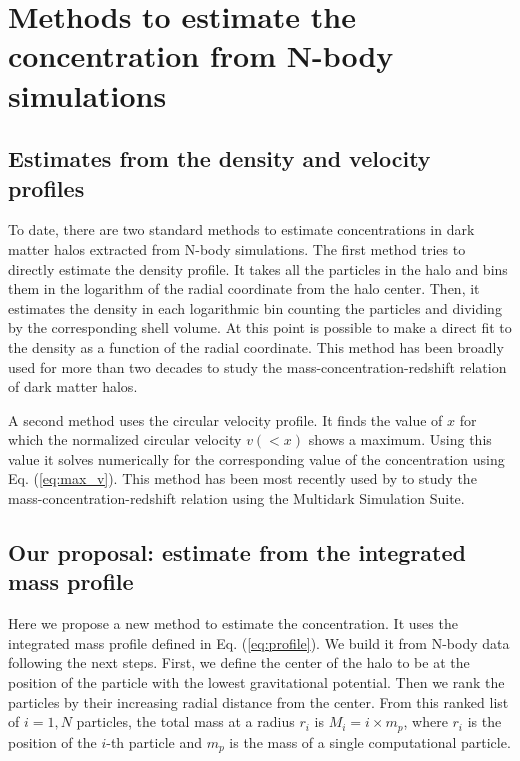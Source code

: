 \documentclass{emulateapj}
\begin{document}
\section{Methods to estimate the concentration from N-body simulations}
\label{sec:method}

\subsection{Estimates from the density and velocity profiles}

To date, there are two standard methods to estimate concentrations in
dark matter halos extracted from N-body simulations.  The first method
tries to directly estimate the density profile.  It takes all the
particles in the halo and bins them in the logarithm of the radial
coordinate from the halo center.  Then, it estimates the density in
each logarithmic bin counting the particles and dividing by the
corresponding shell volume.  At this point is possible to make a
direct fit to the density as a function of the radial coordinate.
This method has been broadly used for more than two decades to study
the mass-concentration-redshift relation of dark matter halos.
 
A second method uses the circular velocity profile.  It finds the
value of $x$ for which the normalized circular velocity $v(<x)$ shows
a maximum.  Using this value it solves numerically for the
corresponding value of the concentration using Eq. (\ref{eq:max_v}).
This method has been most recently used by \cite{Klypin2016} to study
the mass-concentration-redshift relation using the Multidark
Simulation Suite.


\subsection{Our proposal: estimate from the integrated mass profile}

Here we propose a new method to estimate the concentration. 
It uses the integrated mass profile defined in
Eq. (\ref{eq:profile}).  We build it from N-body data following the
next steps.  First, we define the center of the halo to be at the
position of the particle with the lowest gravitational potential.
Then we rank the particles by their increasing radial distance from
the center.  From this ranked list of $i=1,N$ particles, the total
mass at a radius $r_i$ is $M_i=i\times m_p$, where $r_i$ is the
position of the $i$-th particle and $m_p$ is the mass of a single
computational particle.
\end{document}
